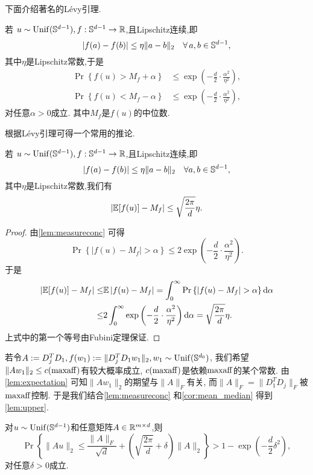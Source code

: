 下面介绍著名的L\'{e}vy引理\cite[页6]{ledoux2005concentration}.
\begin{lemma}\label{lem:measureconc}
  若 \(u \sim \Unif(\mathbb{S}^{d-1}), f:\S^{d-1}\rightarrow
  \R\),且Lipschitz连续,即
  \[|f(a)-f(b)|\le \eta\|a-b\|_2 \quad \forall\, a, b\in \S^{d-1},\]
  其中\(\eta\)是Lipschitz常数,于是
  \begin{align*} 
    \Pr \left\{f(u)  > M_f + \alpha \right\}&\le \exp \left(-
    \frac{d}{2} \cdot \frac{\alpha^2}{\eta^2} \right),\\
    \Pr \left\{f(u)  < M_f - \alpha\right\}&\le \exp \left(-
    \frac{d}{2} \cdot \frac{\alpha^2}{\eta^2} \right),
  \end{align*}
对任意\(\alpha > 0\)成立. 其中\(M_f\)是\(f(u)\)的中位数.
\end{lemma}
根据L\'{e}vy引理可得一个常用的推论.
\begin{corollary} \label{cor:mean_median}
  若 \(u \sim \Unif(\mathbb{S}^{d-1}), f:\S^{d-1}\rightarrow
  \R\),且Lipschitz连续,即
  \[|f(a)-f(b)|\le \eta\|a-b\|_2 \quad \forall a, b\in \S^{d-1},\]
  其中\(\eta\)是Lipschitz常数,我们有
  \begin{align}
    |\E[f(u)]-M_f|\le \sqrt{\frac{2\pi}{d}}\eta.
    \label{eq:mean_median}
  \end{align}
\end{corollary}
\begin{proof}
  由\autoref{lem:measureconc} 可得
  \[\Pr\left\{|f(u)-M_f|>\alpha\right\} \le 2 \exp \left(
  -\frac{d}{2}\cdot \frac{\alpha^2}{\eta^2} \right).\]
  于是
  \begin{align*}
    |\E[f(u)]-M_f|\le& \E\left|f(u)-M_f\right|= 
    \int_0^\infty \Pr\left\{\left|f(u)-M_f\right|>\alpha \right\}\mathrm{d}\alpha\\
    \le& 2 \int_0^\infty \exp\left( 
    -\frac{d}{2}\cdot \frac{\alpha^2}{\eta^2} \right)\mathrm{d}\alpha =
    \sqrt{\frac{2\pi}{d}}\eta.
  \end{align*}
  上式中的第一个等号由Fubini定理保证.
\end{proof}
若令\(A:=D_j^T D_1, f(w_1):=\|D_j^T D_1 w_1\|_2, w_1\sim \Unif(\S^{d_0})\),
我们希望\(\|A w_1\|_2\le c(\maff)\)有较大概率成立,
\(c(\maff)\)是依赖\(\maff\)的某个常数.
由\autoref{lem:expectation} 可知\(\|A w_1\|_2\)的期望与\(\|A\|_F\)有关,
而\(\|A\|_F=\|D_1^T D_j\|_F\)被\(\maff\)控制.
于是我们结合\autoref{lem:measureconc} 和\autoref{cor:mean_median} 
得到\autoref{lem:upper}. 
\begin{lemma} \label{lem:upper}
  对\(u \sim \Unif(\S^{d-1})\)和任意矩阵\(A\in \R^{m\times d}\),则
  \[
    \Pr \left\{ \| Au \|_2  \le \frac{\|A\|_F}{\sqrt{d}} +
    \left (\sqrt{\frac{2\pi}{d}}+\delta\right )\|A\|_2\right\} > 1- \exp \left(
    -\frac{d}{2} \delta^2 \right),
  \]
  对任意\(\delta>0\)成立.
\end{lemma}
